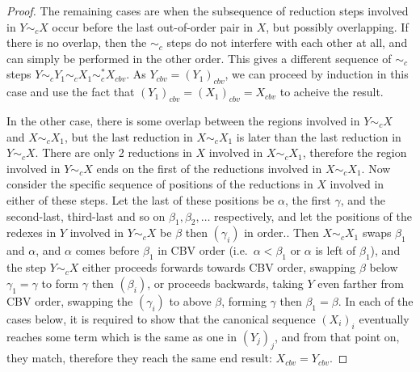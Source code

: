 \documentclass{article}
\theoremstyle{definition}
\theoremstyle{lemma}
\theoremstyle{remark}
\begin{document}
\begin{proof}
The remaining cases are when the subsequence of reduction steps involved in $Y \sim_c X$ occur before the last out-of-order pair in $X$, but possibly overlapping. If there is no overlap, then the $\sim_c$ steps do not interfere with each other at all, and can simply be performed in the other order. This gives a different sequence of $\sim_c$ steps $Y \sim_c Y_1 \sim_c X_1 \sim_c^* X_{cbv}$. As $Y_{cbv} = (Y_1)_{cbv}$, we can proceed by induction in this case and use the fact that $(Y_1)_{cbv} = (X_1)_{cbv} = X_{cbv}$ to acheive the result.

In the other case, there is some overlap between the regions involved in $Y \sim_c X$ and $X \sim_c X_1$, but the last reduction in $X \sim_c X_1$ is later than the last reduction in $Y \sim_c X$. There are only 2 reductions in $X$ involved in $X \sim_c X_1$, therefore the region involved in $Y \sim_c X$ ends on the first of the reductions involved in $X \sim_c X_1$. Now consider the specific sequence of positions of the reductions in $X$ involved in either of these steps. Let the last of these positions be $\alpha$, the first $\gamma$, and the second-last, third-last and so on $\beta_1, \beta_2, \dots$ respectively, and let the positions of the redexes in $Y$ involved in $Y \sim_c X$ be $\beta$ then $(\gamma_i)$ in order.. Then $X \sim_c X_1$ swaps $\beta_1$ and $\alpha$, and $\alpha$ comes before $\beta_1$ in CBV order (i.e.~$\alpha < \beta_1$ or $\alpha$ is left of $\beta_1$), and the step $Y \sim_c X$ either proceeds forwards towards CBV order, swapping $\beta$ below $\gamma_1 = \gamma$ to form $\gamma$ then $(\beta_i)$, or proceeds backwards, taking $Y$ even farther from CBV order, swapping the $(\gamma_i)$ to above $\beta$, forming $\gamma$ then $\beta_1 = \beta$. In each of the cases below, it is required to show that the canonical sequence $(X_i)_i$ eventually reaches some term which is the same as one in $(Y_j)_j$, and from that point on, they match, therefore they reach the same end result: $X_{cbv} = Y_{cbv}$.


\end{proof}
\end{document}
